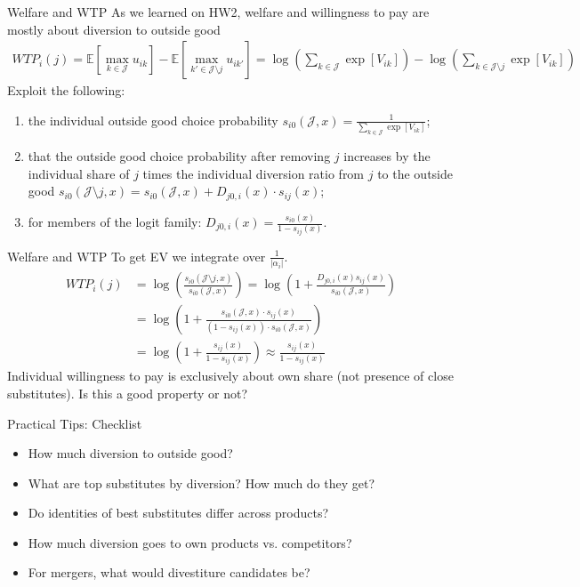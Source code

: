 \documentclass[xcolor=pdftex,dvipsnames,table,mathserif,aspectratio=169]{beamer}
\begin{document}
\begin{frame}{Welfare and WTP}
As we learned on HW2, welfare and willingness to pay are mostly about \alert{diversion to outside good}
\begin{align*}
WTP_i(j) = \mathbb{E}[\max_{k \in \mathcal{J}} u_{ik}]  - \mathbb{E}[\max_{k' \in \mathcal{J}\setminus j} u_{ik'} ] =  \log \left( \sum_{k \in \mathcal{J}} \exp[V_{ik}] \right)-  \log \left(\sum_{k \in \mathcal{J} \setminus j} \exp[V_{ik}]\right)
\end{align*}
Exploit the following:
\begin{enumerate}
 \item the individual outside good choice probability $s_{i0}(\mathcal{J},x) = \frac{1}{ \sum_{k \in \mathcal{J}} \exp[V_{ik}]}$;
 \item  that the outside good choice probability after removing $j$ increases by the individual share of $j$ times the individual diversion ratio from $j$ to the outside good $s_{i0}(\mathcal{J}\setminus j,x)  = s_{i0}(\mathcal{J},x) + D_{j0,i}(x) \cdot s_{ij}(x)$; 
 \item for members of the logit family: $D_{j0,i}(x) = \frac{s_{i0}(x)}{1-s_{ij}(x)}$. 
\end{enumerate}
\end{frame}

\begin{frame}{Welfare and WTP}
To get EV we integrate over $\frac{1}{|\alpha_i|}$.
\begin{align*}
WTP_i(j) &=\log \left( \frac{s_{i0}(\mathcal{J}\setminus j,x) }{s_{i0}(\mathcal{J},x) }\right)
=\log \left( 1+\frac{D_{j0,i}(x) s_{ij}(x)}{s_{i0}(\mathcal{J},x) }\right)\\
&=\log \left( 1+\frac{s_{i0}(\mathcal{J},x) \cdot s_{ij}(x)}{(1-s_{ij}(x)) \cdot s_{i0}(\mathcal{J},x) }\right)\\
&=\log \left( 1+\frac{s_{ij}(x)}{1-s_{ij}(x)  }\right)
\approx \frac{s_{ij}(x)}{1-s_{ij}(x) }
\end{align*}
Individual willingness to pay is exclusively about \alert{own share} (not presence of close substitutes). Is this a good property or not?
\end{frame}


\begin{frame}{Practical Tips: Checklist}
\begin{itemize}
\item How much diversion to outside good?
\item What are top substitutes by diversion? How much do they get?
\item Do identities of best substitutes differ across products?
\item How much diversion goes to own products vs. competitors?
\item For mergers, what would \alert{divestiture} candidates be?
\end{itemize}
\end{frame}
\end{document}
